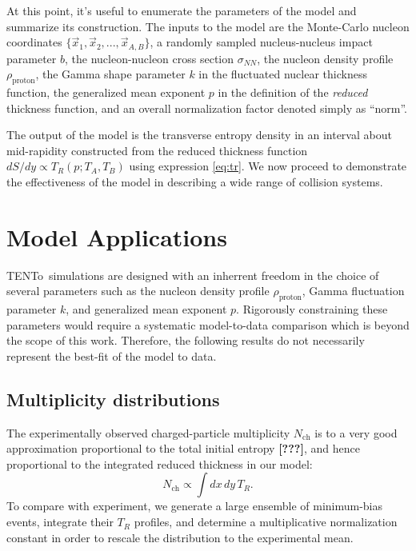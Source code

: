 \documentclass[aps,prl,reprint,amsmath,nofootinbib]{revtex4-1}
\newcommand{\trento}{T\raisebox{-.5ex}{R}ENTo}
\newcommand{\nch}{N_\text{ch}}
\newcommand{\needcite}{\textbf{[???]}}
\begin{document}
At this point, it's useful to enumerate the parameters of the model and summarize its construction. 
The inputs to the model are the Monte-Carlo nucleon coordinates $\{\vec{x}_1,\vec{x}_2,...,\vec{x}_{A,B}\}$, a randomly sampled 
nucleus-nucleus impact parameter $b$, the nucleon-nucleon cross section $\sigma_{NN}$, the nucleon density profile 
$\rho_{\mathrm{proton}}$, the Gamma shape parameter $k$ in the fluctuated nuclear thickness function, the generalized 
mean exponent $p$ in the definition of the \emph{reduced} thickness function, and an overall normalization factor denoted simply as ``norm''.

The output of the model is the transverse entropy density in an interval about mid-rapidity constructed from the reduced thickness function 
$dS/dy \propto T_R(p;T_A,T_B)$ using expression \eqref{eq:tr}. We now proceed to demonstrate the effectiveness of the model in 
describing a wide range of collision systems.

\section{Model Applications}

\trento\ simulations are designed with an inherrent freedom in the choice of several parameters such as the nucleon density profile $\rho_\mathrm{proton}$, Gamma fluctuation parameter $k$,
and generalized mean exponent $p$. Rigorously constraining these parameters would require a systematic model-to-data comparison which is beyond the scope of this work.  
Therefore, the following results do not necessarily represent the best-fit of the model to data.

\subsection{Multiplicity distributions}

The experimentally observed charged-particle multiplicity $\nch$ is to a very good approximation proportional to the total initial
entropy \needcite, and hence proportional to the integrated reduced thickness in our model:
\begin{equation}
  \nch \propto \int dx \, dy \, T_R.
\end{equation}
To compare with experiment, we generate a large ensemble of minimum-bias events, integrate their $T_R$
profiles, and determine a multiplicative normalization constant in order to rescale the distribution to the experimental mean.
\end{document}
